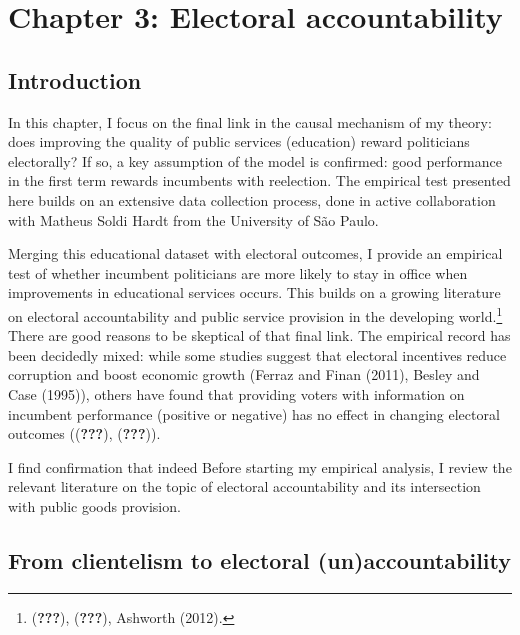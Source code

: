 \documentclass[12pt,]{article}
\let\rmarkdownfootnote\footnote%
\def\footnote{\protect\rmarkdownfootnote}
\begin{document}
\pagebreak

\hypertarget{chapter-3-electoral-accountability}{%
\section{Chapter 3: Electoral
accountability}\label{chapter-3-electoral-accountability}}

\hypertarget{introduction-2}{%
\subsection{Introduction}\label{introduction-2}}

In this chapter, I focus on the final link in the causal mechanism of my
theory: does improving the quality of public services (education) reward
politicians electorally? If so, a key assumption of the model is
confirmed: good performance in the first term rewards incumbents with
reelection. The empirical test presented here builds on an extensive
data collection process, done in active collaboration with Matheus Soldi
Hardt from the University of São Paulo.

Merging this educational dataset with electoral outcomes, I provide an
empirical test of whether incumbent politicians are more likely to stay
in office when improvements in educational services occurs. This builds
on a growing literature on electoral accountability and public service
provision in the developing world.\footnote{({\textbf{???}}),
  ({\textbf{???}}), Ashworth (2012).} There are good reasons to be
skeptical of that final link. The empirical record has been decidedly
mixed: while some studies suggest that electoral incentives reduce
corruption and boost economic growth (Ferraz and Finan (2011), Besley
and Case (1995)), others have found that providing voters with
information on incumbent performance (positive or negative) has no
effect in changing electoral outcomes (({\textbf{???}}),
({\textbf{???}})).

I find confirmation that indeed Before starting my empirical analysis, I
review the relevant literature on the topic of electoral accountability
and its intersection with public goods provision.

\hypertarget{from-clientelism-to-electoral-unaccountability}{%
\subsection{From clientelism to electoral
(un)accountability}\label{from-clientelism-to-electoral-unaccountability}}
\end{document}
